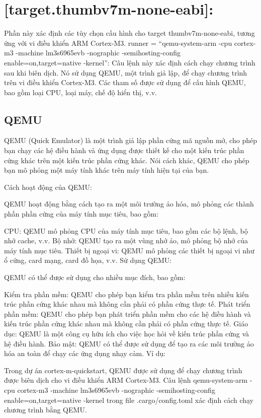 \documentclass[
  letterpaper,
  DIV=11,
  numbers=noendperiod]{scrreprt}
\begin{document}
\section{{[}target.thumbv7m-none-eabi{]}:}\label{target.thumbv7m-none-eabi}

Phần này xác định các tùy chọn cấu hình cho target thumbv7m-none-eabi,
tương ứng với vi điều khiển ARM Cortex-M3. runner = ``qemu-system-arm
-cpu cortex-m3 -machine lm3s6965evb -nographic -semihosting-config
enable=on,target=native -kernel'': Câu lệnh này xác định cách chạy
chương trình sau khi biên dịch. Nó sử dụng QEMU, một trình giả lập, để
chạy chương trình trên vi điều khiển Cortex-M3. Các tham số được sử dụng
để cấu hình QEMU, bao gồm loại CPU, loại máy, chế độ hiển thị, v.v.

\subsection{QEMU}\label{qemu}

QEMU (Quick Emulator) là một trình giả lập phần cứng mã nguồn mở, cho
phép bạn chạy các hệ điều hành và ứng dụng được thiết kế cho một kiến
trúc phần cứng khác trên một kiến trúc phần cứng khác. Nói cách khác,
QEMU cho phép bạn mô phỏng một máy tính khác trên máy tính hiện tại của
bạn.

Cách hoạt động của QEMU:

QEMU hoạt động bằng cách tạo ra một môi trường ảo hóa, mô phỏng các
thành phần phần cứng của máy tính mục tiêu, bao gồm:

CPU: QEMU mô phỏng CPU của máy tính mục tiêu, bao gồm các bộ lệnh, bộ
nhớ cache, v.v. Bộ nhớ: QEMU tạo ra một vùng nhớ ảo, mô phỏng bộ nhớ của
máy tính mục tiêu. Thiết bị ngoại vi: QEMU mô phỏng các thiết bị ngoại
vi như ổ cứng, card mạng, card đồ họa, v.v. Sử dụng QEMU:

QEMU có thể được sử dụng cho nhiều mục đích, bao gồm:

Kiểm tra phần mềm: QEMU cho phép bạn kiểm tra phần mềm trên nhiều kiến
trúc phần cứng khác nhau mà không cần phải có phần cứng thực tế. Phát
triển phần mềm: QEMU cho phép bạn phát triển phần mềm cho các hệ điều
hành và kiến trúc phần cứng khác nhau mà không cần phải có phần cứng
thực tế. Giáo dục: QEMU là một công cụ hữu ích cho việc học hỏi về kiến
trúc phần cứng và hệ điều hành. Bảo mật: QEMU có thể được sử dụng để tạo
ra các môi trường ảo hóa an toàn để chạy các ứng dụng nhạy cảm. Ví dụ:

Trong dự án cortex-m-quickstart, QEMU được sử dụng để chạy chương trình
được biên dịch cho vi điều khiển ARM Cortex-M3. Câu lệnh qemu-system-arm
-cpu cortex-m3 -machine lm3s6965evb -nographic -semihosting-config
enable=on,target=native -kernel trong file .cargo/config.toml xác định
cách chạy chương trình bằng QEMU.
\end{document}

